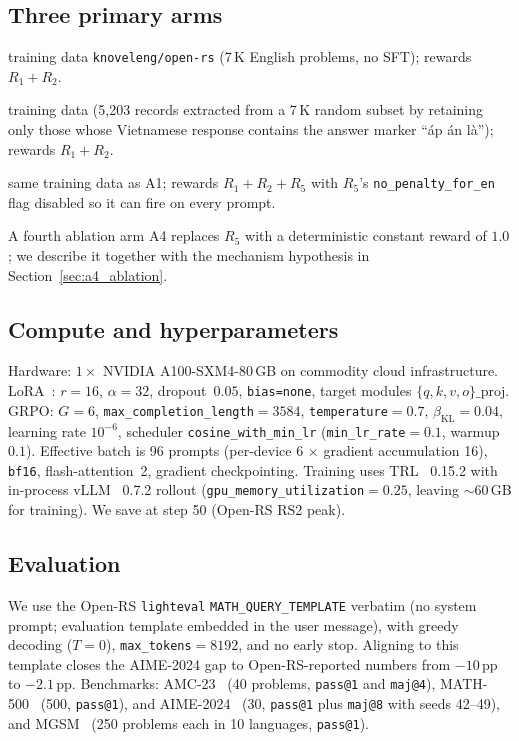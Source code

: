 \documentclass[11pt]{article}
\newcommand{\armA}{\textsc{A1}}
\newcommand{\armB}{\textsc{A2}}
\newcommand{\armC}{\textsc{A3}}
\newcommand{\armD}{\textsc{A4}}
\newcommand{\R}[1]{R_{#1}}
\begin{document}
\subsection{Three primary arms}
\begin{description}\itemsep0pt
\item[\armA{} (English-only)] training data \texttt{knoveleng/open-rs}
(7\,K English problems, no SFT); rewards $\R{1}+\R{2}$.
\item[\armB{} (Vietnamese-translated)] training data
 (5{,}203 records
extracted from a 7\,K random subset by retaining only those whose
Vietnamese response contains the answer marker
``\DJ\'ap \'an l\`a''); rewards $\R{1}+\R{2}$.
\item[\armC{} (English with $\R{5}$)] same training data as \armA{};
rewards $\R{1}+\R{2}+\R{5}$ with $\R{5}$'s
\texttt{no\_penalty\_for\_en} flag disabled so it can fire on every
prompt.
\end{description}
A fourth ablation arm \armD{} replaces $\R{5}$ with a deterministic
constant reward of $1.0$; we describe it together with the mechanism
hypothesis in Section~\ref{sec:a4_ablation}.

\subsection{Compute and hyperparameters}
Hardware: $1\times$ NVIDIA A100-SXM4-80\,GB on commodity cloud
infrastructure. LoRA~\cite{hu2022lora}: $r{=}16$, $\alpha{=}32$,
dropout~$0.05$, \texttt{bias=none}, target modules
$\{q,k,v,o\}\_\mathrm{proj}$. GRPO: $G{=}6$,
\texttt{max\_completion\_length}$=3584$, \texttt{temperature}$=0.7$,
$\beta_{\text{KL}}=0.04$, learning rate $10^{-6}$, scheduler
\texttt{cosine\_with\_min\_lr} (\texttt{min\_lr\_rate}$=0.1$,
warmup $0.1$). Effective batch is 96 prompts (per-device 6 $\times$
gradient accumulation 16), \texttt{bf16}, flash-attention~2, gradient
checkpointing. Training uses TRL~\cite{trl_2025} 0.15.2 with
in-process vLLM~\cite{kwon2023vllm} 0.7.2 rollout
(\texttt{gpu\_memory\_utilization}$=0.25$, leaving $\sim 60$\,GB for
training). We save at step 50 (Open-RS RS2 peak).

\subsection{Evaluation}
We use the Open-RS \texttt{lighteval} \texttt{MATH\_QUERY\_TEMPLATE}
verbatim (no system prompt; evaluation template embedded in the user
message), with greedy decoding ($T{=}0$), \texttt{max\_tokens}$=8192$,
and no early stop. Aligning to this template closes the AIME-2024 gap
to Open-RS-reported numbers from $-10$\,pp to $-2.1$\,pp. Benchmarks:
AMC-23~\cite{amc23_dataset} (40 problems, \texttt{pass@1} and
\texttt{maj@4}), MATH-500~\cite{lightman2024verify} (500,
\texttt{pass@1}), and AIME-2024~\cite{aime2024_dataset} (30,
\texttt{pass@1} plus \texttt{maj@8} with seeds 42--49), and
MGSM~\cite{mgsm_2022} (250 problems each in 10 languages,
\texttt{pass@1}).
\end{document}
